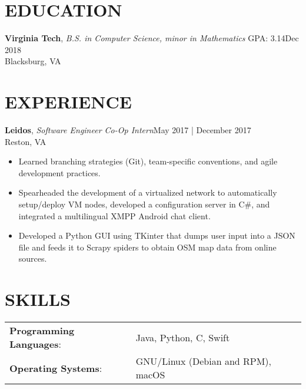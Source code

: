 \documentclass[line,margin]{res}
\begin{document}
\address{randy8@vt.edu | (571) 296-6786 | github.com/kidcharlemagne}
\begin{resume}
	\vspace{-5mm}
	\section{EDUCATION}
	\textbf{Virginia Tech}, {\sl B.S. in Computer Science, minor in Mathematics} GPA: 3.14\hfill Dec 2018\\Blacksburg, VA
	\section{EXPERIENCE}
	\textbf{Leidos}, {\sl Software Engineer Co-Op Intern}\hfill May 2017 | December 2017\\Reston, VA\\\begin{itemize} \itemsep 1pt
	\item Learned branching strategies (Git), team-specific conventions, and agile development practices.
	\item Spearheaded the development of a virtualized network to automatically setup/deploy VM nodes, developed a configuration server in C#, and integrated a multilingual XMPP Android chat client.
	\item Developed a Python GUI using TKinter that dumps user input into a JSON file and feeds it to Scrapy spiders to obtain OSM map data from online sources.
	\end{itemize}
	\section{SKILLS}
	\begin{tabular}{@{}ll}
		\textbf{Programming Languages}: & Java, Python, C, Swift   \\
		\textbf{Operating Systems}:     & GNU/Linux (Debian and RPM), macOS \\
	\end{tabular}

\end{resume}
\end{document}
